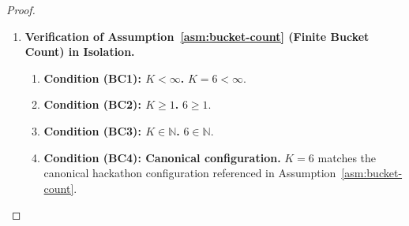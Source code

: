 \documentclass[12pt,openany]{book}
\newcommand{\calF}{\mathcal{F}}
\newcommand{\Prob}{\mathbb{P}}
\numberwithin{equation}{chapter}
\theoremstyle{plain}
\theoremstyle{definition}
\theoremstyle{remark}
\numberwithin{equation}{chapter}
\theoremstyle{plain}
\begin{document}
\begin{proof}
\begin{enumerate}[label=\textbf{Phase~\Roman*.}]
\begin{enumerate}[label=\textbf{Step~3.\arabic*.}]
  \item \textbf{Condition \textbf{(IC2)}: $W_0$ is deterministic
        (constant $\Prob$-a.s.).}
        $W_0$ is a real constant; it does not depend on $\omega$.
        The constant function $\omega \mapsto 100{,}000$ is
        $\calF_0$-measurable (every constant is measurable with
        respect to the trivial sigma-algebra $\calF_0 =
        \{\emptyset,\Omega\}$, because $\{W_0 > c\}$ equals either
        $\emptyset$ or $\Omega$ for any $c \in \mathbb{R}$, both of
        which belong to $\calF_0$).
        \hfill\checkmark

  \item \textbf{Condition \textbf{(IC3)}: $W_0 < \infty$.}
        $100{,}000 < \infty$.
        \hfill\checkmark

  \item \textbf{Condition \textbf{(IC4)}: $W_0 \in \mathbb{R}$.}
        $100{,}000 \in \mathbb{R}$.
        \hfill\checkmark

  \item \textbf{Condition \textbf{(IC5)}: $W_0$ is
        $\calF_0$-measurable.}
        Established in Step~3.2 above: constant functions are
        measurable with respect to any sigma-algebra, including the
        trivial one.
        \hfill\checkmark

\end{enumerate}

All sub-conditions \textbf{(IC1)}--\textbf{(IC5)} are satisfied.

\item \textbf{Verification of Assumption~\ref{asm:bucket-count}
              (Finite Bucket Count) in Isolation.}

\begin{enumerate}[label=\textbf{Step~4.\arabic*.}]

  \item \textbf{Condition \textbf{(BC1)}: $K < \infty$.}
        $K = 6 < \infty$.
        \hfill\checkmark

  \item \textbf{Condition \textbf{(BC2)}: $K \geq 1$.}
        $6 \geq 1$.
        \hfill\checkmark

  \item \textbf{Condition \textbf{(BC3)}: $K \in \mathbb{N}$.}
        $6 \in \mathbb{N}$.
        \hfill\checkmark

  \item \textbf{Condition \textbf{(BC4)}: Canonical configuration.}
        $K = 6$ matches the canonical hackathon configuration
        referenced in Assumption~\ref{asm:bucket-count}.
        \hfill\checkmark


\end{enumerate}
\end{enumerate}
\end{proof}
\end{document}
